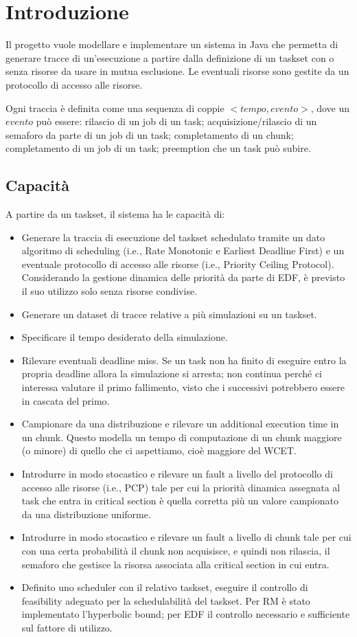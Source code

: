 \chapter{Introduzione}
Il progetto vuole modellare e implementare un sistema in Java che permetta di generare tracce di un'esecuzione a partire dalla definizione di un taskset con o senza risorse da usare in mutua esclusione. Le eventuali risorse sono gestite da un protocollo di accesso alle risorse.

Ogni traccia è definita come una sequenza di coppie $<tempo, evento>$, dove un $evento$ può essere: rilascio di un job di un task; acquisizione/rilascio di un semaforo da parte di un job di un task; completamento di un chunk; completamento di un job di un task; preemption che un task può subire.

\section{Capacità}
A partire da un taskset, il sistema ha le capacità di:
\begin{itemize}
    \item Generare la traccia di esecuzione del taskset schedulato tramite un dato algoritmo di scheduling (i.e., Rate Monotonic e Earliest Deadline First) e un eventuale protocollo di accesso alle risorse (i.e., Priority Ceiling Protocol). Considerando la gestione dinamica delle priorità da parte di EDF, è previsto il suo utilizzo solo senza risorse condivise.
    \item Generare un dataset di tracce relative a più simulazioni su un taskset.
    \item Specificare il tempo desiderato della simulazione.
    \item Rilevare eventuali deadline miss. Se un task non ha finito di eseguire entro la propria deadline allora la simulazione si arresta; non continua perché ci interessa valutare il primo fallimento, visto che i successivi potrebbero essere in cascata del primo.
    \item Campionare da una distribuzione e rilevare un additional execution time in un chunk. Questo modella un tempo di computazione di un chunk maggiore (o minore) di quello che ci aspettiamo, cioè maggiore del WCET.
    \item Introdurre in modo stocastico e rilevare un fault a livello del protocollo di accesso alle risorse (i.e., PCP) tale per cui la priorità dinamica assegnata al task che entra in critical section è quella corretta più un valore campionato da una distribuzione uniforme.
    \item Introdurre in modo stocastico e rilevare un fault a livello di chunk tale per cui con una certa probabilità il chunk non acquisisce, e quindi non rilascia, il semaforo che gestisce la risorsa associata alla critical section in cui entra.
    \item Definito uno scheduler con il relativo taskset, eseguire il controllo di feasibility adeguato per la schedulabilità del taskset. Per RM è stato implementato l'hyperbolic bound; per EDF il controllo necessario e sufficiente sul fattore di utilizzo.
\end{itemize}